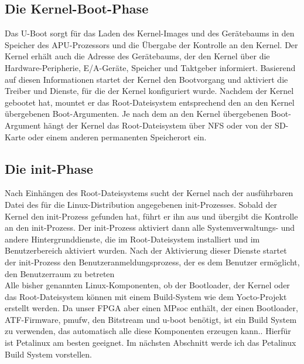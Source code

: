 \subsection{Die Kernel-Boot-Phase}
Das U-Boot sorgt für das Laden des Kernel-Images und des Gerätebaums in den Speicher des APU-Prozessors und die Übergabe der Kontrolle an den Kernel. Der Kernel erhält auch die Adresse des Gerätebaums, der den Kernel über die Hardware-Peripherie, E/A-Geräte, Speicher und Taktgeber informiert. Basierend auf diesen Informationen startet der Kernel den Bootvorgang und aktiviert die Treiber und Dienste, für die der Kernel konfiguriert wurde. Nachdem der Kernel gebootet hat, mountet er das Root-Dateisystem entsprechend den an den Kernel übergebenen Boot-Argumenten. Je nach dem an den Kernel übergebenen Boot-Argument hängt der Kernel das Root-Dateisystem über NFS oder von der SD-Karte oder einem anderen permanenten Speicherort ein.

\subsection{Die init-Phase}

Nach Einhängen des Root-Dateisystems sucht der Kernel nach der ausführbaren Datei des für die Linux-Distribution angegebenen init-Prozesses. Sobald der Kernel den init-Prozess gefunden hat, führt er ihn aus und übergibt die Kontrolle an den init-Prozess. Der init-Prozess aktiviert dann alle Systemverwaltungs- und andere Hintergrunddienste, die im Root-Dateisystem installiert und im Benutzerbereich aktiviert wurden. Nach der Aktivierung dieser Dienste startet der init-Prozess den Benutzeranmeldungsprozess, der es dem Benutzer ermöglicht, den Benutzerraum zu betreten\\
Alle bisher genannten Linux-Komponenten, ob der Bootloader, der Kernel oder das Root-Dateisystem können mit einem Build-System wie dem Yocto-Projekt erstellt werden. Da unser FPGA aber einen MPsoc enthält, der einen Bootloader, ATF-Firmware, pmufw, den Bitstream und u-boot benötigt, ist ein Build System zu verwenden, das automatisch alle diese Komponenten erzeugen kann.. Hierfür ist Petalinux am besten geeignet. Im nächsten Abschnitt werde ich das Petalinux Build System vorstellen. 


